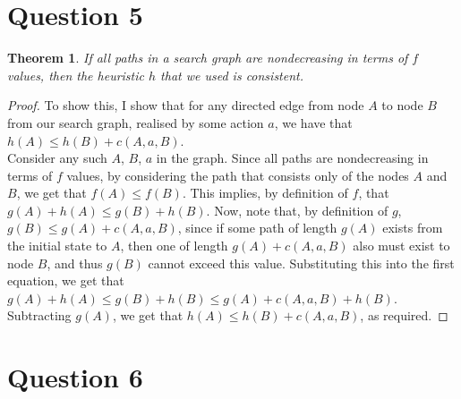 \documentclass[a4paper,12pt]{scrartcl}
\newtheorem{theorem}{Theorem}
\begin{document}
\section*{Question 5}
\begin{theorem}
    If all paths in a search graph are nondecreasing in terms of $f$ values, then the heuristic $h$ that we used is consistent.
\end{theorem}
\begin{proof}
    To show this, I show that for any directed edge from node $A$ to node $B$ from our search graph, realised by some action $a$, we have that $h(A) \leq h(B) + c(A, a, B)$. \\
    Consider any such $A$, $B$, $a$ in the graph. Since all paths are nondecreasing in terms of $f$ values, by considering the path that consists only of the nodes $A$ and $B$, we get that $f(A) \leq f(B)$. This implies, by definition of $f$, that $g(A) + h(A) \leq g(B) + h(B)$. Now, note that, by definition of $g$, $g(B) \leq g(A) + c(A, a, B)$, since if some path of length $g(A)$ exists from the initial state to $A$, then one of length $g(A) + c(A, a, B)$ also must exist to node $B$, and thus $g(B)$ cannot exceed this value. Substituting this into the first equation, we get that $g(A) + h(A) \leq g(B) + h(B) \leq g(A) + c(A, a, B) + h(B)$. Subtracting $g(A)$, we get that $h(A) \leq h(B) + c(A, a, B)$, as required.
\end{proof}

\section*{Question 6}
\end{document}
